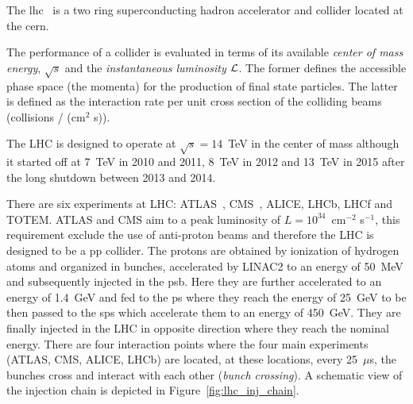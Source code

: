 The \gls{lhc}~\cite{LHC} is a two ring superconducting hadron accelerator and
collider located at the \gls{cern}.

The performance of a collider is evaluated in terms of its available
\emph{center of mass energy}, $\sqrt{s}$ and the \emph{instantaneous luminosity}
$\mathcal{L}$. The former defines the accessible phase space (the momenta) for the
production of final state particles. The latter is defined as the interaction
rate per unit cross section of the colliding beams (collisions / (cm$^2$
s)).

The LHC is designed to operate at $\sqrt{s} = 14$~TeV in the center of mass
although it started off at 7~TeV in 2010 and 2011, 8~TeV in 2012 and 13~TeV in
2015 after the long shutdown between 2013 and 2014.

There are six experiments at LHC: ATLAS~\cite{ATLASPaper},
CMS~\cite{1748-0221-3-08-S08004}, ALICE, LHCb, LHCf and TOTEM. ATLAS and CMS aim
to a peak luminosity of $L = 10^{34}$~cm$^{-2}$ s$^{-1}$, this requirement
exclude the use of anti-proton beams and therefore the LHC is designed to be a
\gls{pp} collider. The protons are obtained by ionization of hydrogen atoms and
organized in bunches, accelerated by LINAC2 to an energy of 50~MeV and
subsequently injected in the \gls{psb}. Here they are further accelerated to an
energy of 1.4~GeV and fed to the \gls{ps} where they reach the energy of 25~GeV
to be then passed to the \gls{sps} which accelerate them to an energy of
450~GeV. They are finally injected in the LHC in opposite direction where they
reach the nominal energy. There are four interaction points where the four main
experiments (ATLAS, CMS, ALICE, LHCb) are located, at these locations, every
25~$\mu$s, the bunches cross and interact with each other (\emph{bunch
  crossing}). A schematic view of the injection chain is depicted in
Figure~\ref{fig:lhc_inj_chain}.

